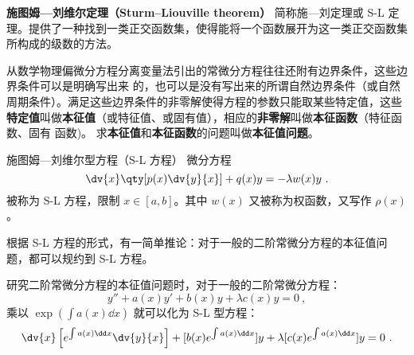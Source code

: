 
\begin{issues}
\issueDraft
{}
\end{issues}





\textbf{施图姆—刘维尔定理（Sturm–Liouville theorem）} 简称施—刘定理或 S-L 定理。提供了一种找到一类正交函数集，使得能将一个函数展开为这一类正交函数集所构成的级数的方法。

\begin{definition}{}
从数学物理偏微分方程分离变量法引出的常微分方程往往还附有边界条件，这些边界条件可以是明确写出来 的，也可以是没有写出来的所谓自然边界条件（或自然周期条件）。满足这些边界条件的非零解使得方程的参数只能取某些特定值，这些\textbf{特定值}叫做\textbf{本征值}（或特征值、或固有值），相应的\textbf{非零解}叫做\textbf{本征函数}（特征函数、固有 函数)。
求\textbf{本征值}和\textbf{本征函数}的问题叫做\textbf{本征值问题}。
\end{definition}

\begin{definition}{施图姆—刘维尔型方程（S-L 方程）}
微分方程
\begin{equation}\label{eq_SLthrm_1}
\dv{x}\qty[p(x)\dv{y}{x}] + q(x) y = -\lambda w(x) y~.
\end{equation}
被称为 S-L 方程，限制 $x \in [a, b]$。其中 $w(x)$ 又被称为权函数，又写作 $\rho(x)$。
\end{definition}

根据 S-L 方程的形式，有一简单推论：对于一般的二阶常微分方程的本征值问题，都可以规约到 S-L 方程。
\begin{corollary}{}
研究二阶常微分方程的本征值问题时，对于一般的二阶常微分方程：
$$y'' + a(x) y' +b(x) y + \lambda c(x) y = 0 ~,$$
乘以 $\exp(\int a(x) \dd x)$ 就可以化为 S-L 型方程：
$$\dv{x} \left[e^{\int a(x) \dd x} \dv{y}{x}\right]  + [b(x) e^{\int a(x) \dd x}]y +\lambda[c(x) e^{\int a(x) \dd x}] y = 0~.$$
\end{corollary}

